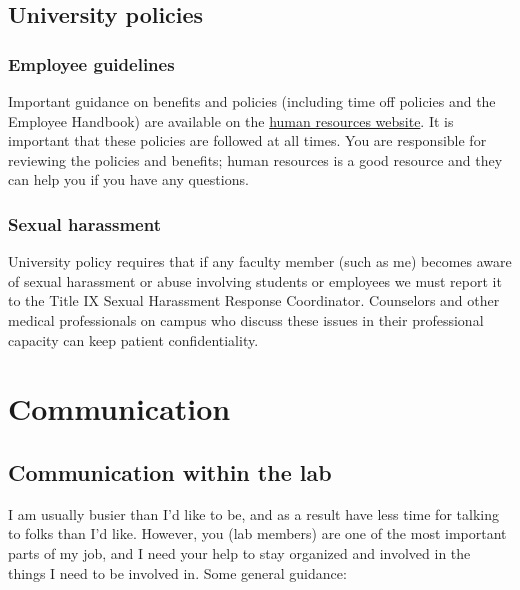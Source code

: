 \documentclass[letterpaper,12pt,oneside]{memoir}
\begin{document}
\section{University policies}

\subsection{Employee guidelines}
Important guidance on benefits and policies (including time off policies and the Employee Handbook) are available on the \href{https://www.temple.edu/faculty-and-staff/working-temple/human-resources}{human resources website}. It is important that these policies are followed at all times. You are responsible for reviewing the policies and benefits; human resources is a good resource and they can help you if you have any questions.

\subsection{Sexual harassment}
University policy requires that if any faculty member (such as me) becomes aware of sexual harassment or abuse involving students or employees we must report it to the Title IX Sexual Harassment Response Coordinator. Counselors and other medical professionals on campus who discuss these issues in their professional capacity can keep patient confidentiality.



\chapter{Communication}
\section{Communication within the lab}
\label{sec:communicationInLab}

I am usually busier than I'd like to be, and as a result have less time for talking to folks than I'd like. However, you (lab members) are one of the most important parts of my job, and I need your help to stay organized and involved in the things I need to be involved in. Some general guidance:
\end{document}
